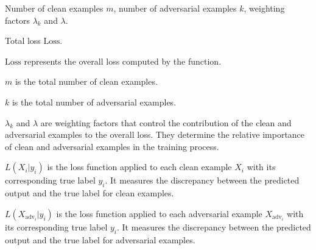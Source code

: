 
Number of clean examples $m$, number of adversarial examples $k$, weighting factors $\lambda_k$ and $\lambda$.

Total loss $\text{Loss}$.



$\text{Loss}$ represents the overall loss computed by the function.

$m$ is the total number of clean examples.

$k$ is the total number of adversarial examples.

$\lambda_k$ and $\lambda$ are weighting factors that control the contribution of the clean and adversarial examples to the overall loss. They determine the relative importance of clean and adversarial examples in the training process.

$L(X_i | y_i)$ is the loss function applied to each clean example $X_i$ with its corresponding true label $y_i$. It measures the discrepancy between the predicted output and the true label for clean examples.

$L(X_{\text{adv}_i} | y_i)$ is the loss function applied to each adversarial example $X_{\text{adv}_i}$ with its corresponding true label $y_i$. It measures the discrepancy between the predicted output and the true label for adversarial examples.